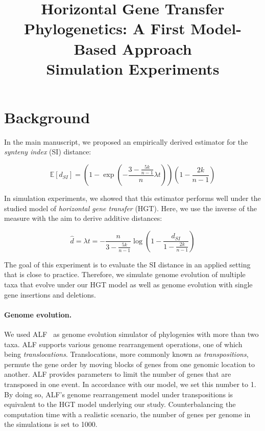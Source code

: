 \documentclass[9pt,english,utf8]{article}
\title{Horizontal Gene Transfer Phylogenetics: A First Model-Based Approach\\
Simulation Experiments}
\begin{document}
\maketitle

\section{Background}

In the main manuscript, we proposed an empirically derived estimator for the
\emph{synteny index} (SI) distance:

\begin{equation}
    \mathbb E[d_{SI}] = \left(1-\exp\left(-\frac{3-\frac{5k}{n-1}}{n} \lambda
    t\right)\right) \left(1-\frac{2k}{n-1}\right)
\end{equation}

In simulation experiments, we showed that this estimator performs well under
the studied model of \emph{horizontal gene transfer} (HGT). Here, we use the
inverse of the measure with the aim to derive additive distances:

\begin{equation}
    \hat d= \lambda t = -\frac{n}{3-\frac{5k}{n-1}}
    \log\left(1 - \frac{d_{SI}}{1-\frac{2k}{n-1}}\right)
\end{equation}

The goal of this experiment is to evaluate the SI distance in an applied
setting that is close to practice. Therefore, we simulate genome evolution of
multiple taxa that evolve under our HGT model as well as genome evolution with
single gene insertions and deletions. 

\paragraph{Genome evolution.} We used ALF~\cite{Dalquen:2012dx} as genome
evolution simulator of phylogenies with more than two taxa. ALF supports
various genome rearrangement operations, one of which being
\emph{translocations}. Translocations, more commonly known as
\emph{transpositions}, permute the gene order by moving blocks of genes from
one genomic location to another. ALF provides parameters to limit the number of
genes that are transposed in one event. In accordance with our model, we set
this number to 1. By doing so, ALF's genome rearrangement model under
transpositions is equivalent to the HGT model underlying our study.
Counterbalancing the computation time with a realistic scenario, the number of
genes per genome in the simulations is set to 1000. 
\end{document}
